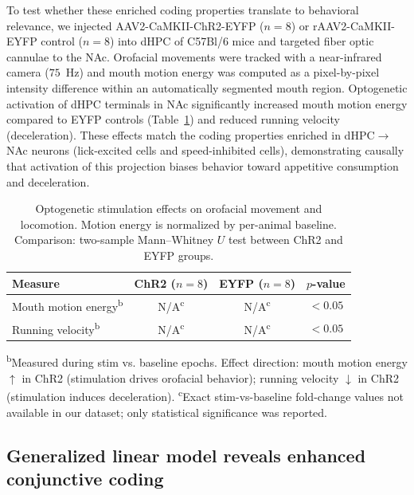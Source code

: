 \documentclass[11pt]{article}
\begin{document}
To test whether these enriched coding properties translate to behavioral relevance, we injected AAV2-CaMKII-ChR2-EYFP ($n=8$) or rAAV2-CaMKII-EYFP control ($n=8$) into dHPC of C57Bl/6 mice and targeted fiber optic cannulae to the NAc. Orofacial movements were tracked with a near-infrared camera ($75$~Hz) and mouth motion energy was computed as a pixel-by-pixel intensity difference within an automatically segmented mouth region. Optogenetic activation of dHPC terminals in NAc significantly increased mouth motion energy compared to EYFP controls (Table~\ref{tab:opto}) and reduced running velocity (deceleration). These effects match the coding properties enriched in dHPC$\to$NAc neurons (lick-excited cells and speed-inhibited cells), demonstrating causally that activation of this projection biases behavior toward appetitive consumption and deceleration.

\begin{table}[H]
\centering
\caption{Optogenetic stimulation effects on orofacial movement and locomotion. Motion energy is normalized by per-animal baseline. Comparison: two-sample Mann--Whitney $U$ test between ChR2 and EYFP groups.}
\label{tab:opto}
\begin{tabular}{lccc}
\toprule
Measure & ChR2 ($n=8$) & EYFP ($n=8$) & $p$-value \\
\midrule
Mouth motion energy\textsuperscript{b} & N/A\textsuperscript{c} & N/A\textsuperscript{c} & $<0.05$ \\
Running velocity\textsuperscript{b} & N/A\textsuperscript{c} & N/A\textsuperscript{c} & $<0.05$ \\
\bottomrule
\end{tabular}
\vspace{2pt}

\footnotesize{\textsuperscript{b}Measured during stim vs. baseline epochs. Effect direction: mouth motion energy $\uparrow$ in ChR2 (stimulation drives orofacial behavior); running velocity $\downarrow$ in ChR2 (stimulation induces deceleration). \textsuperscript{c}Exact stim-vs-baseline fold-change values not available in our dataset; only statistical significance was reported.}
\end{table}

\subsection{Generalized linear model reveals enhanced conjunctive coding}
\end{document}

